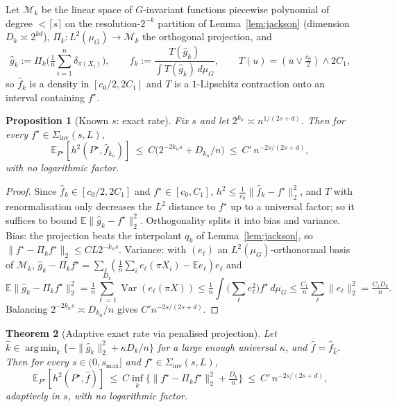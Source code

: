 \documentclass[11pt]{article}
\theoremstyle{plain}
\newtheorem{theorem}{Theorem}[section]
\newtheorem{proposition}[theorem]{Proposition}
\theoremstyle{definition}
\theoremstyle{remark}
\newcommand{\E}{\mathbb{E}}
\newcommand{\Siv}{\Sigma_{\mathrm{inv}}}
\DeclareMathOperator*{\argmin}{arg\,min}
\DeclareMathOperator{\Var}{Var}
\begin{document}
Let $\mathcal M_k$ be the linear space of $G$-invariant functions piecewise
polynomial of degree $<\lceil s\rceil$ on the resolution-$2^{-k}$ partition of
Lemma~\ref{lem:jackson} (dimension $D_k\asymp2^{kd}$), $\Pi_k:L^2(\mu_G)\to\mathcal M_k$
the orthogonal projection, and
\[
\widehat g_k:=\Pi_k\Big(\tfrac1n\sum_{i=1}^n\delta_{\pi(X_i)}\Big),\qquad
\widehat f_k:=\frac{T(\widehat g_k)}{\int T(\widehat g_k)\,d\mu_G},\qquad
T(u)=(u\vee\tfrac{c_0}2)\wedge2C_1 ,
\]
so $\widehat f_k$ is a density in $[c_0/2,2C_1]$ and $T$ is a $1$-Lipschitz
contraction onto an interval containing $f^\star$.

\begin{proposition}[Known $s$: exact rate]\label{prop:knowns}
Fix $s$ and let $2^{k_n}\asymp n^{1/(2s+d)}$. Then for every
$f^\star\in\Siv(s,L)$,
\[
\E_{P^\star}[h^2(P^\star,\widehat f_{k_n})]\ \le\ C\big(2^{-2k_ns}+D_{k_n}/n\big)\ \le\ C'\,n^{-2s/(2s+d)},
\]
with no logarithmic factor.
\end{proposition}

\begin{proof}
Since $\widehat f_k\in[c_0/2,2C_1]$ and $f^\star\in[c_0,C_1]$, $h^2\le\tfrac1{c_0}\|\widehat f_k-f^\star\|_2^2$,
and $T$ with renormalisation only decreases the $L^2$ distance to $f^\star$ up to a
universal factor; so it suffices to bound $\E\|\widehat g_k-f^\star\|_2^2$.
Orthogonality splits it into bias and variance. Bias: the projection beats the
interpolant $q_k$ of Lemma~\ref{lem:jackson}, so
$\|f^\star-\Pi_kf^\star\|_2\le CL2^{-k_ns}$. Variance: with $(e_\ell)$ an
$L^2(\mu_G)$-orthonormal basis of $\mathcal M_k$,
$\widehat g_k-\Pi_kf^\star=\sum_\ell(\tfrac1n\sum_i e_\ell(\pi X_i)-\E e_\ell)e_\ell$ and
\[
\E\|\widehat g_k-\Pi_kf^\star\|_2^2=\tfrac1n\sum_{\ell=1}^{D_k}\Var(e_\ell(\pi X))
\le\tfrac1n\int\big(\textstyle\sum_\ell e_\ell^2\big)f^\star\,d\mu_G\le\tfrac{C_1}n\sum_\ell\|e_\ell\|_2^2=\tfrac{C_1D_k}n .
\]
Balancing $2^{-2k_ns}\asymp D_{k_n}/n$ gives $C'n^{-2s/(2s+d)}$.
\end{proof}

\begin{theorem}[Adaptive exact rate via penalised projection]\label{thm:adaptive}
Let $\widehat k\in\argmin_k\{-\|\widehat g_k\|_2^2+\kappa D_k/n\}$ for a large
enough universal $\kappa$, and $\widehat f=\widehat f_{\widehat k}$. Then for every
$s\in(0,s_{\max}]$ and $f^\star\in\Siv(s,L)$,
\[
\E_{P^\star}[h^2(P^\star,\widehat f)]\ \le\ C\inf_k\Big\{\|f^\star-\Pi_kf^\star\|_2^2+\tfrac{D_k}n\Big\}\ \le\ C'\,n^{-2s/(2s+d)},
\]
adaptively in $s$, with no logarithmic factor.
\end{theorem}
\end{document}
